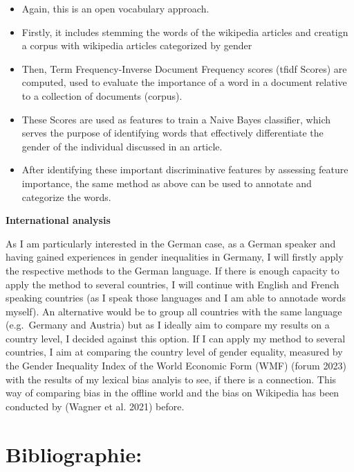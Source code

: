 \documentclass[
]{article}
\providecommand{\tightlist}{%
  \setlength{\itemsep}{0pt}\setlength{\parskip}{0pt}}
\begin{document}
\begin{itemize}
\tightlist
\item
  Again, this is an open vocabulary approach.
\item
  Firstly, it includes stemming the words of the wikipedia articles and
  creatign a corpus with wikipedia articles categorized by gender
\item
  Then, Term Frequency-Inverse Document Frequency scores (tfidf Scores)
  are computed, used to evaluate the importance of a word in a document
  relative to a collection of documents (corpus).
\item
  These Scores are used as features to train a Naive Bayes classifier,
  which serves the purpose of identifying words that effectively
  differentiate the gender of the individual discussed in an article.
\item
  After identifying these important discriminative features by assessing
  feature importance, the same method as above can be used to annotate
  and categorize the words.
\end{itemize}

\textbf{International analysis}

As I am particularly interested in the German case, as a German speaker
and having gained experiences in gender inequalities in Germany, I will
firstly apply the respective methods to the German language. If there is
enough capacity to apply the method to several countries, I will
continue with English and French speaking countries (as I speak those
languages and I am able to annotade words myself). An alternative would
be to group all countries with the same language (e.g.~Germany and
Austria) but as I ideally aim to compare my results on a country level,
I decided against this option. If I can apply my method to several
countries, I aim at comparing the country level of gender equality,
measured by the Gender Inequality Index of the World Economic Form (WMF)
(forum 2023) with the results of my lexical bias analyis to see, if
there is a connection. This way of comparing bias in the offline world
and the bias on Wikipedia has been conducted by (Wagner et al. 2021)
before.

\hypertarget{bibliographie}{%
\section{Bibliographie:}\label{bibliographie}}
\end{document}
